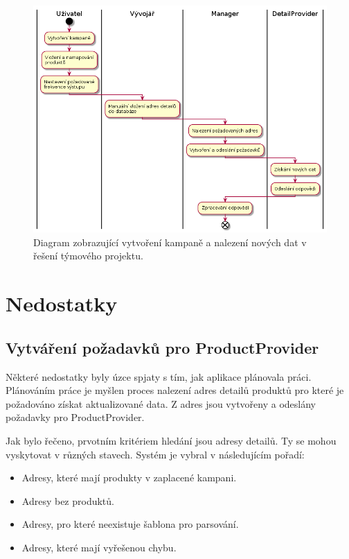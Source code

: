 \documentclass[thesis=B,czech]{FITthesis}[2012/06/26]
\begin{document}
\begin{figure}[h]\centering
 	\includegraphics[width=1.0\textwidth]{resources/legacy-process-activity}
	\caption[Diagram zobrazující vytvoření kampaně a nalezení nových dat v původním řešení týmového projektu]
	{Diagram zobrazující vytvoření kampaně a nalezení nových dat v řešení týmového projektu.}\label{fig:legacyprocess-activity}
\end{figure}

\section{Nedostatky}

\subsection{Vytváření požadavků pro ProductProvider}
Některé nedostatky byly úzce spjaty s tím, jak aplikace plánovala práci. Plánováním práce je myšlen proces
nalezení adres detailů produktů pro které je požadováno získat aktualizované data. Z adres jsou vytvořeny a odeslány požadavky pro ProductProvider.
\par
Jak bylo řečeno, prvotním kritériem hledání jsou adresy detailů. Ty se mohou vyskytovat v různých stavech. Systém je vybral v 
následujícím pořadí:

\begin{itemize}
\item Adresy, které mají produkty v zaplacené kampani.
\item Adresy bez produktů.
\item Adresy, pro které neexistuje šablona pro parsování.
\item Adresy, které mají vyřešenou chybu.
\end{itemize}
\end{document}
